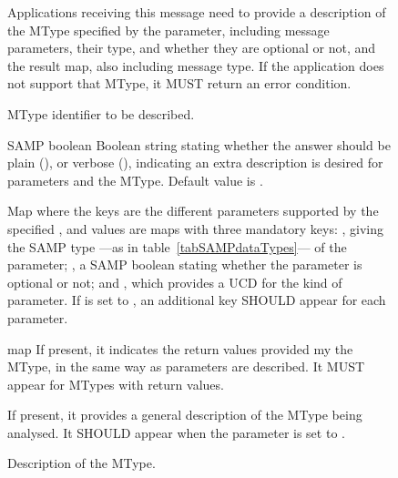 		\begin{figure}[htbp]
			\centering
			\begin{minipage}{0.9\textwidth}
				\begin{framed}
							{
								Applications receiving this message
								need to provide a description of the
								MType specified by the 
								parameter, including message
								parameters, their type, and whether
								they are optional or not, and the
								result map, also including message
								type. If the application does not
								support that MType, it MUST return an
								error condition.
							}
							{
								{MType identifier to be described.}

								{SAMP boolean}
								{
								Boolean string stating whether the
								answer should be plain
								(), or verbose
								(), indicating an
								extra description is desired for
								parameters and the MType. Default
								value is .
								}
							}
							{
								{
								Map where the keys are the
								different parameters supported by
								the specified , and
								values are maps with three
								mandatory keys: ,
								giving the SAMP type ---as in
								table~\ref{tabSAMPdataTypes}--- of
								the parameter; , a
								SAMP boolean stating whether the
								parameter is optional or not; and
								, which provides a UCD
								for the kind of parameter. If
								 is set to
								, an additional
								 key
								SHOULD appear for each parameter.
								}
								
								{map}
								{
								If present, it indicates the return
								values provided my the
								 MType, in the same
								way as parameters are described. It
								MUST appear for MTypes with return
								values.
								}
								
								{
								If present, it provides a general
								description of the MType being
								analysed. It SHOULD appear when the
								 parameter is set
								to .
								}
							}
				\end{framed}
			\end{minipage}
			\caption[ MType description]
			{Description of the  MType.}
			\label{fig:movoirDescribeMtype}
		\end{figure}
		
